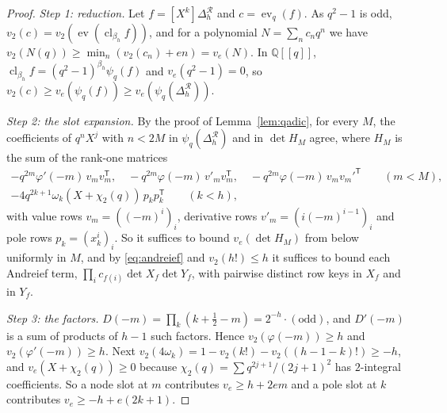 \documentclass[11pt]{amsart}
\theoremstyle{definition}
\theoremstyle{remark}
\numberwithin{equation}{section}
\newcommand{\QQ}{\mathbb{Q}}
\newcommand{\cR}{\mathcal{R}}
\newcommand{\cl}{\operatorname{cl}}
\newcommand{\ev}{\operatorname{ev}}
\begin{document}
\begin{proof}
\emph{Step 1: reduction.} Let $f=[X^k]\Delta^{\cR}_h$ and $c=\ev_q(f)$. As $q^2-1$ is odd,
$v_2(c)=v_2(\ev(\cl_{\beta_h}f))$, and for a polynomial $N=\sum_nc_nq^n$ we have $v_2(N(q))\ge\min_n(v_2(c_n)+en)=v_e(N)$.
In $\QQ[[q]]$, $\cl_{\beta_h}f=(q^2-1)^{\beta_h}\psi_q(f)$ and $v_e(q^2-1)=0$, so $v_2(c)\ge v_e(\psi_q(f))\ge v_e(\psi_q(\Delta^{\cR}_h))$.

\emph{Step 2: the slot expansion.} By the proof of Lemma~\ref{lem:qadic}, for every $M$, the coefficients of $q^nX^j$ with
$n<2M$ in $\psi_q(\Delta^{\cR}_h)$ and in $\det H_M$ agree, where $H_M$ is the sum of the rank-one matrices
\begin{gather*}
  -q^{2m}\varphi'(-m)\,v_mv_m^{\mathsf T},\quad -q^{2m}\varphi(-m)\,v'_mv_m^{\mathsf T},\quad
  -q^{2m}\varphi(-m)\,v_mv_m'^{\mathsf T}\qquad(m<M),\\
  -4q^{2k+1}\omega_k(X+\chi_2(q))\,p_kp_k^{\mathsf T}\qquad(k<h),
\end{gather*}
with value rows $v_m=((-m)^i)_i$, derivative rows $v'_m=(i(-m)^{i-1})_i$ and pole rows $p_k=(x_k^i)_i$. So it suffices to
bound $v_e(\det H_M)$ from below uniformly in $M$, and by \eqref{eq:andreief} and $v_2(h!)\le h$ it suffices to bound each
Andreief term, $\prod_ic_{f(i)}\det X_f\det Y_f$, with pairwise distinct row keys in $X_f$ and in $Y_f$.

\emph{Step 3: the factors.} $D(-m)=\prod_k(k+\frac12-m)=2^{-h}\cdot(\text{odd})$, and $D'(-m)$ is a sum of products of $h-1$
such factors. Hence $v_2(\varphi(-m))\ge h$ and $v_2(\varphi'(-m))\ge h$. Next $v_2(4\omega_k)=1-v_2(k!)-v_2((h-1-k)!)\ge-h$,
and $v_e(X+\chi_2(q))\ge0$ because $\chi_2(q)=\sum q^{2j+1}/(2j+1)^2$ has $2$-integral coefficients. So a node slot at $m$
contributes $v_e\ge h+2em$ and a pole slot at $k$ contributes $v_e\ge-h+e(2k+1)$.


\end{proof}
\end{document}
